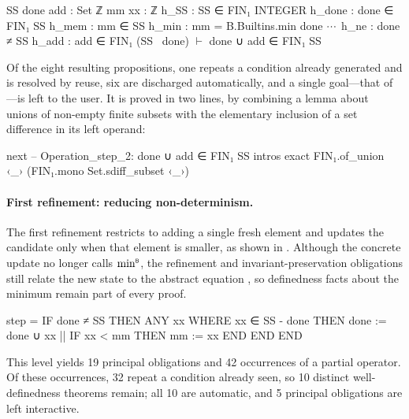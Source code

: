 \begin{leanlisting}[title={Invariant preservation, with the elided
    well-definedness argument shown as \(\irrelprf\).},
    label={lst:barrel-step-goal}, float=t]
SS done add : Set ℤ
mm xx       : ℤ
h_SS        : SS ∈ FIN₁ INTEGER
h_done      : done ∈ FIN₁ SS
h_mem       : mm ∈ SS
h_min       : mm = B.Builtins.min done $\irrelprf$
h_ne        : done ≠ SS
h_add       : add ∈ FIN₁ (SS \ done)
$\vdash$ done ∪ add ∈ FIN₁ SS
\end{leanlisting}

Of the eight resulting propositions, one repeats a condition already generated and is
resolved by reuse, six are discharged automatically, and a single goal---that of
---is left to the user.
It is proved in two lines, by combining a \barrel{} lemma about unions of non-empty finite
subsets with the elementary inclusion of a set difference in its left operand:

\begin{leanlisting}[title={The only interactive obligation of the abstract machine.},
    label={lst:barrel-minsearch-proof}]
next -- Operation_step_2: done ∪ add ∈ FIN₁ SS
  intros
  exact FIN₁.of_union ‹_› (FIN₁.mono Set.sdiff_subset ‹_›)
\end{leanlisting}

\FloatBarrier

\paragraph*{First refinement: reducing non-determinism.}
The first refinement restricts  to adding a single fresh element and updates the
candidate only when that element is smaller, as shown in
.
Although the concrete update no longer calls \(\mathop{{\min}^{\scriptscriptstyle{\mathsf{B}}}}\), the refinement and
invariant-preservation obligations still relate the new state to the abstract equation
, so definedness facts about the minimum remain part of every proof.

\begin{blisting}[title={The refined operation \texttt{step} in \texttt{MinSearch\_r1}.},
    label={lst:barrel-minsearch-r1}, float=t]
step =
  IF done ≠ SS THEN
    ANY xx WHERE xx ∈ SS - done THEN
      done := done ∪ {xx} || IF xx < mm THEN mm := xx END
    END
  END
\end{blisting}

This level yields 19 principal obligations and 42 occurrences of a partial operator.
Of these occurrences, 32 repeat a condition already seen, so 10 distinct well-definedness
theorems remain; all 10 are automatic, and 5 principal obligations are left interactive.

